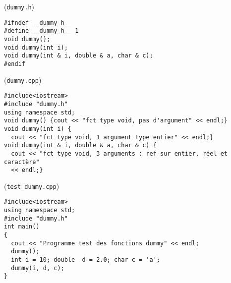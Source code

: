 \documentclass[c]{beamer}
\begin{document}
\begin{frame}[fragile]{}
 \begin{cbox}[][lwuc](\texttt{dummy.h})
\begin{verbatim}
#ifndef __dummy_h__
#define __dummy_h__ 1
void dummy();
void dummy(int i);
void dummy(int & i, double & a, char & c);
#endif
\end{verbatim}

\vspace{-0cm}
\end{cbox}

\begin{cbox}[][lwuc](\texttt{dummy.cpp})
\begin{verbatim}
#include<iostream>
#include "dummy.h"
using namespace std;
void dummy() {cout << "fct type void, pas d'argument" << endl;}
void dummy(int i) {
  cout << "fct type void, 1 argument type entier" << endl;}
void dummy(int & i, double & a, char & c) {
  cout << "fct type void, 3 arguments : ref sur entier, réel et caractère"
  << endl;}
\end{verbatim}

\vspace{-0cm}
\end{cbox}
\end{frame}


\begin{frame}[fragile]{}
\begin{cbox}[][lwuc](\texttt{test\_dummy.cpp})
  \begin{verbatim}
#include<iostream>
using namespace std;
#include "dummy.h"
int main()
{
  cout << "Programme test des fonctions dummy" << endl;
  dummy();
  int i = 10; double  d = 2.0; char c = 'a';
  dummy(i, d, c);
}
\end{verbatim}
\end{cbox}
\end{frame}


\end{document}
